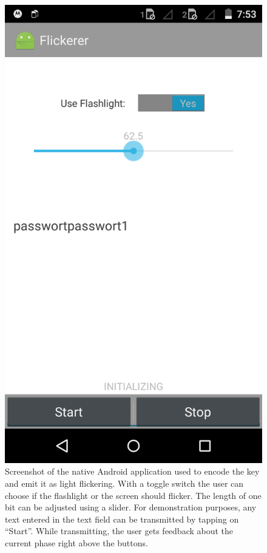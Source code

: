 \documentclass{sig-alternate} %
\begin{document}
\begin{figure}
	\centering
	\includegraphics[scale=.15]{images/screen_native.png}
	\caption{Screenshot of the native Android application used to encode the key and emit it as light flickering. With a toggle switch the user can choose if the flashlight or the screen should flicker. The length of one bit can be adjusted using a slider. For demonstration purposes, any text entered in the text field can be transmitted by tapping on ``Start''. While transmitting, the user gets feedback about the current phase right above the buttons.}
	\label{fig:screenshot}
\end{figure}
\end{document}

